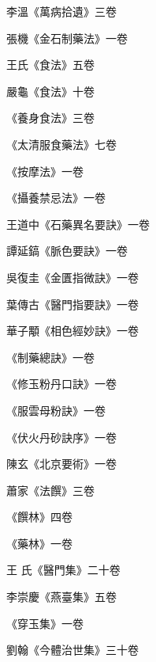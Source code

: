 \begin{pinyinscope}
 李溫《萬病拾遺》三卷



 張機《金石制藥法》一卷



 王氏《食法》五卷



 嚴龜《食法》十卷



 《養身食法》三卷



 《太清服食藥法》七卷



 《按摩法》一卷



 《攝養禁忌法》一卷



 王道中《石藥異名要訣》一卷



 譚延鎬《脈色要訣》一卷



 吳復圭《金匱指微訣》一卷



 葉傳古《醫門指要訣》一卷



 華子顒《相色經妙訣》一卷



 《制藥總訣》一卷



 《修玉粉丹口訣》一卷



 《服雲母粉訣》一卷



 《伏火丹砂訣序》一卷



 陳玄《北京要術》一卷



 蕭家《法饌》三卷



 《饌林》四卷



 《藥林》一卷



 王
 氏《醫門集》二十卷



 李崇慶《燕臺集》五卷



 《穿玉集》一卷



 劉翰《今體治世集》三十卷




\end{pinyinscope}
